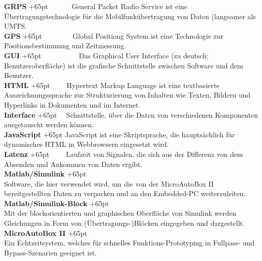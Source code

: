\documentclass[fontsize = 12pt, paper = a4]{scrreprt}
\begin{document}
\textbf{GRPS}
\hangindent+65pt  
\ \ \ \ \ \ General Packet Radio Service ist eine Übertragungstechnologie für die Mobilfunkübertragung von Daten (langsamer als UMTS.\\

\textbf{GPS}
\hangindent+65pt  
\ \ \ \ \ \ \  \ Global Positiong System ist eine Technologie zur Positionsbestimmung und Zeitmessung.\\

\textbf{GUI}
\hangindent+65pt  
\ \ \ \ \ \ \ \ \ \   Das Graphical User Interface (zu deutsch: Benutzeroberfläche) ist die graf\-ische Schnittstelle zwischen Software und dem Benutzer.\\

\textbf{HTML}
\hangindent+65pt 
\ \ \ \ Hypertext Markup Language ist eine textbasierte Auszeichnungssprache zur Strukturierung von Inhalten wie Texten, Bildern und Hyperlinks in Dokumenten und im Internet.\\

\textbf{Interface}
\hangindent+65pt 
\ \ Schnittstelle, über die Daten von verschiedenen Komponenten ausgetauscht werden können.\\

\textbf{JavaScript}
\hangindent+65pt 
JavaScript ist eine Skriptsprache, die hauptsächlich für dynamisches HTML in Webbrowsern eingesetzt wird. \\

\textbf{Latenz}
\hangindent+65pt 
\ \ \ \ Laufzeit von Signalen, die sich aus der Differenz von dem Absenden und Ankommen von Daten ergibt.\\

\textbf{Matlab/Simulink}
\hangindent+65pt  \\
Software, die hier verwendet wird, um die von der MicroAutoBox II bereitgestellten Daten zu verpacken und an den Embedded-PC weiterzuleiten.\\

\textbf{Matlab/Simulink-Block}
\hangindent+65pt  \\
Mit der blockorientierten und graphischen Oberfläche von Simulink werden Gleichungen in Form von (Übertragungs-)Blöcken eingegeben und dargestellt.\\

\textbf{MicroAutoBox II}
\hangindent+65pt  \\
Ein Echtzeitsystem, welches für schnelles Funktions-Prototyping in Fullpass- und Bypass-Szenarien geeignet ist.\\
\end{document}
